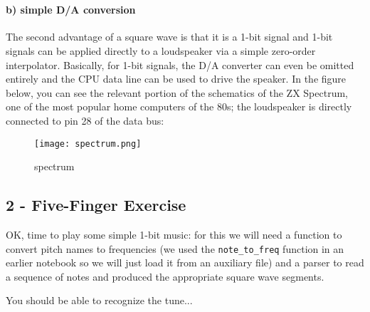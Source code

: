 \documentclass[11pt]{article}
\makeatletter
\def\maxwidth{\ifdim\Gin@nat@width>\linewidth\linewidth
    \else\Gin@nat@width\fi}
\let\Oldincludegraphics\includegraphics
\renewcommand{\includegraphics}[1]{\Oldincludegraphics[width=.8\maxwidth]{#1}}
\makeatother
\begin{document}
    \begin{center}
    \end{center}
    { \hspace*{\fill} \\}
    
    \paragraph{b) simple D/A conversion}\label{b-simple-da-conversion}

The second advantage of a square wave is that it is a 1-bit signal and
1-bit signals can be applied directly to a loudspeaker via a simple
zero-order interpolator. Basically, for 1-bit signals, the D/A converter
can even be omitted entirely and the CPU data line can be used to drive
the speaker. In the figure below, you can see the relevant portion of
the schematics of the ZX Spectrum, one of the most popular home
computers of the 80s; the loudspeaker is directly connected to pin 28 of
the data bus:

\begin{figure}
\centering
\texttt{[image: spectrum.png]}
\caption{spectrum}
\end{figure}

\subsection{2 - Five-Finger Exercise}\label{five-finger-exercise}

OK, time to play some simple 1-bit music: for this we will need a
function to convert pitch names to frequencies (we used the
\texttt{note\_to\_freq} function in an earlier notebook so we will just
load it from an auxiliary file) and a parser to read a sequence of notes
and produced the appropriate square wave segments.

You should be able to recognize the tune...
\end{document}
